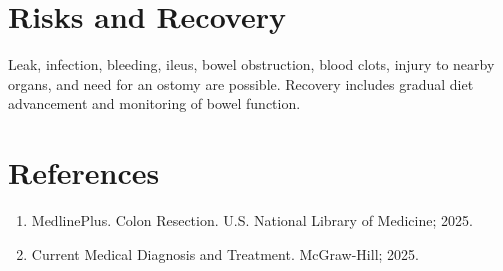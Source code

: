 \section*{Risks and Recovery}
Leak, infection, bleeding, ileus, bowel obstruction, blood clots, injury to nearby organs, and need for an ostomy are possible. Recovery includes gradual diet advancement and monitoring of bowel function.
\section*{References}
\begin{enumerate}\item MedlinePlus. Colon Resection. U.S. National Library of Medicine; 2025.\item Current Medical Diagnosis and Treatment. McGraw-Hill; 2025.\end{enumerate}
\clearpage
